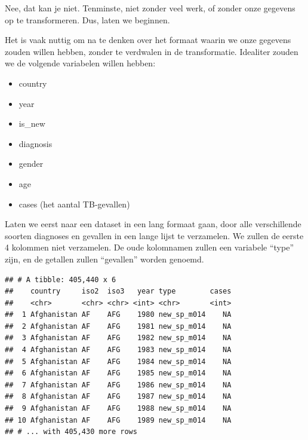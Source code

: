 \documentclass[]{tufte-book}
\newenvironment{Shaded}{}{}
\newcommand{\DataTypeTok}[1]{\textcolor[rgb]{0.56,0.13,0.00}{#1}}
\newcommand{\KeywordTok}[1]{\textcolor[rgb]{0.00,0.44,0.13}{\textbf{#1}}}
\newcommand{\NormalTok}[1]{#1}
\newcommand{\OperatorTok}[1]{\textcolor[rgb]{0.40,0.40,0.40}{#1}}
\newcommand{\StringTok}[1]{\textcolor[rgb]{0.25,0.44,0.63}{#1}}
\providecommand{\tightlist}{%
  \setlength{\itemsep}{0pt}\setlength{\parskip}{0pt}}
\begin{document}
Nee, dat kan je niet. Tenminste, niet zonder veel werk, of zonder onze gegevens op te transformeren. Dus, laten we beginnen.

Het is vaak nuttig om na te denken over het formaat waarin we onze gegevens zouden willen hebben, zonder te verdwalen in de transformatie. Idealiter zouden we de volgende variabelen willen hebben:

\begin{itemize}
\tightlist
\item
  country
\item
  year
\item
  is\_new
\item
  diagnosis
\item
  gender
\item
  age
\item
  cases (het aantal TB-gevallen)
\end{itemize}

Laten we eerst naar een dataset in een lang formaat gaan, door alle verschillende soorten diagnoses en gevallen in een lange lijst te verzamelen. We zullen de eerste 4 kolommen niet verzamelen. De oude kolomnamen zullen een variabele ``type'' zijn, en de getallen zullen ``gevallen'' worden genoemd.

\begin{Shaded}
\end{Shaded}

\begin{verbatim}
## # A tibble: 405,440 x 6
##    country     iso2  iso3   year type        cases
##    <chr>       <chr> <chr> <int> <chr>       <int>
##  1 Afghanistan AF    AFG    1980 new_sp_m014    NA
##  2 Afghanistan AF    AFG    1981 new_sp_m014    NA
##  3 Afghanistan AF    AFG    1982 new_sp_m014    NA
##  4 Afghanistan AF    AFG    1983 new_sp_m014    NA
##  5 Afghanistan AF    AFG    1984 new_sp_m014    NA
##  6 Afghanistan AF    AFG    1985 new_sp_m014    NA
##  7 Afghanistan AF    AFG    1986 new_sp_m014    NA
##  8 Afghanistan AF    AFG    1987 new_sp_m014    NA
##  9 Afghanistan AF    AFG    1988 new_sp_m014    NA
## 10 Afghanistan AF    AFG    1989 new_sp_m014    NA
## # ... with 405,430 more rows
\end{verbatim}
\end{document}

